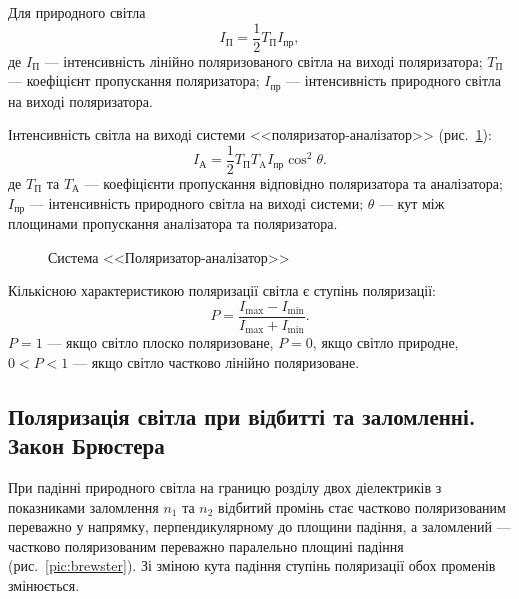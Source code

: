 Для природного світла
\begin{equation}\label{eq:Malus_law_for_nature}
    I_\text{П} = \frac12 T_\text{П}I_\text{пр},
\end{equation}
де $ I_\text{П} $ --- інтенсивність лінійно поляризованого світла на виході
поляризатора; $ T_\text{П} $ --- коефіцієнт пропускання поляризатора; $ I_\text{пр} $ ---
інтенсивність природного світла на виході поляризатора.

Інтенсивність світла на виході системи <<поляризатор-аналізатор>>
(рис.~\ref{pic:P-A}):
\begin{equation}\label{eq:Malus_law_for_P-A}
    I_\text{А} = \frac12 T_\text{П} T_\text{A} I_\text{пр}\cos^2\theta.
\end{equation}
де $ T_\text{П} $ та $ T_\text{А} $ --- коефіцієнти пропускання відповідно поляризатора та аналізатора; $ I_\text{пр} $ --- інтенсивність природного світла на виході системи; $\theta$ ---
кут між площинами пропускання аналізатора та поляризатора.

\begin{figure}[h!]\centering

\caption{Система <<Поляризатор-аналізатор>>}
\label{pic:P-A}
\end{figure}


Кількісною характеристикою поляризації світла є
ступінь поляризації:
\begin{equation}\label{eq:P}
    P = \frac{I_{\max} - I_{\min}}{I_{\max} + I_{\min}}.
\end{equation}
$P = 1$ --- якщо світло плоско поляризоване, $P = 0$, якщо світло
природне, $0 < P < 1$ --- якщо світло частково лінійно поляризоване.


\subsection*{Поляризація світла при відбитті та заломленні. Закон Брюстера}


При падінні природного світла на границю розділу двох діелектриків з показниками заломлення $ n_1 $ та $ n_2 $ відбитий промінь стає частково поляризованим переважно у напрямку, перпендикулярному до площини падіння, а заломлений --- частково поляризованим переважно паралельно площині падіння (рис.~\ref{pic:brewster}). Зі зміною кута падіння ступінь поляризації обох променів змінюється.


